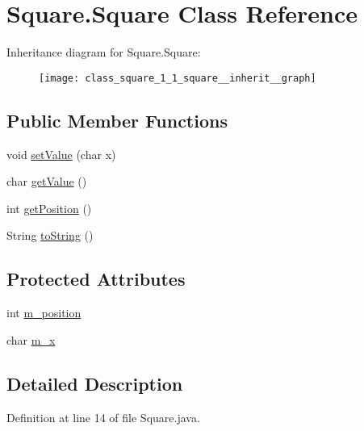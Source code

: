 \hypertarget{class_square_1_1_square}{}\section{Square.\+Square Class Reference}
\label{class_square_1_1_square}


Inheritance diagram for Square.\+Square\+:
\nopagebreak
\begin{figure}[H]
\begin{center}
\leavevmode
\texttt{[image: class\_square\_1\_1\_square\_\_inherit\_\_graph]}
\end{center}
\end{figure}
\subsection*{Public Member Functions}
\begin{DoxyCompactItemize}
\item 
void \hyperlink{class_square_1_1_square_a660b369288339117bda29e9a47dae8f6}{set\+Value} (char x)
\item 
char \hyperlink{class_square_1_1_square_a0afb61e6814c61ae2036b15a1a958e6f}{get\+Value} ()
\item 
int \hyperlink{class_square_1_1_square_a270f9a35b0432406d2464201ece4c6b0}{get\+Position} ()
\item 
String \hyperlink{class_square_1_1_square_ab94a6f61d25fde4e49055fcb09d6f33a}{to\+String} ()
\end{DoxyCompactItemize}
\subsection*{Protected Attributes}
\begin{DoxyCompactItemize}
\item 
int \hyperlink{class_square_1_1_square_a459ef3208bfff1bc1a693a335c2cd5e5}{m\+\_\+position}
\item 
char \hyperlink{class_square_1_1_square_a9e0779af7f8cbe54b28f95bb4a5d165a}{m\+\_\+x}
\end{DoxyCompactItemize}


\subsection{Detailed Description}


Definition at line 14 of file Square.\+java.



